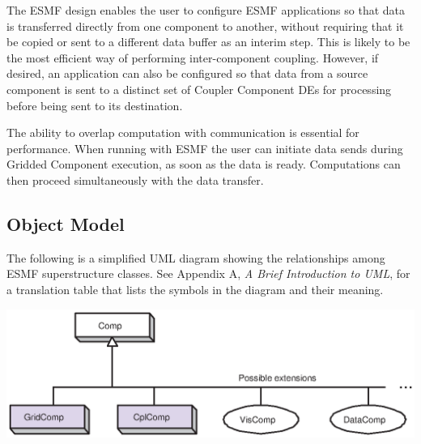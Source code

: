 The ESMF design enables the user to configure ESMF
applications so that data is transferred directly from one component 
to another, without requiring that it be copied or sent to a different data
buffer as an interim step.  This is likely to be the most efficient way 
of performing inter-component coupling.  However, if desired, an 
application can also be configured so that data from a source component 
is sent to a distinct set of Coupler Component DEs for processing 
before being sent to its destination.

The ability to overlap computation with communication is essential for
performance.  When running with ESMF the user can initiate data 
sends during Gridded Component execution, as soon as the data is ready.
Computations can then proceed simultaneously with the data transfer.

\newpage
\subsection{Object Model}

The following is a simplified UML diagram showing the relationships among
ESMF superstructure classes.  See Appendix A, {\it A Brief Introduction 
to UML}, for a translation table that lists the symbols in the diagram 
and their meaning.

\begin{center}
\includegraphics{Comp_obj.eps}   
\end{center}



